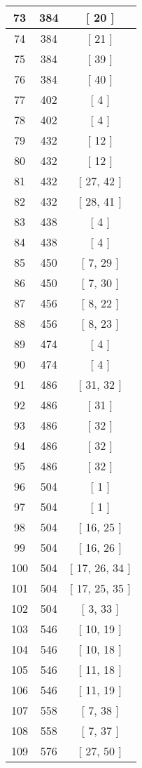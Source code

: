 \begin{center}
\begin{longtable}[H]{|| c c c ||}
\hline
73 & 384 & [ 20 ] \\ 
\hline
74 & 384 & [ 21 ] \\ 
\hline
75 & 384 & [ 39 ] \\ 
\hline
76 & 384 & [ 40 ] \\ 
\hline
77 & 402 & [ 4 ] \\ 
\hline
78 & 402 & [ 4 ] \\ 
\hline
79 & 432 & [ 12 ] \\ 
\hline
80 & 432 & [ 12 ] \\ 
\hline
81 & 432 & [ 27, 42 ] \\ 
\hline
82 & 432 & [ 28, 41 ] \\ 
\hline
83 & 438 & [ 4 ] \\ 
\hline
84 & 438 & [ 4 ] \\ 
\hline
85 & 450 & [ 7, 29 ] \\ 
\hline
86 & 450 & [ 7, 30 ] \\ 
\hline
87 & 456 & [ 8, 22 ] \\ 
\hline
88 & 456 & [ 8, 23 ] \\ 
\hline
89 & 474 & [ 4 ] \\ 
\hline
90 & 474 & [ 4 ] \\ 
\hline
91 & 486 & [ 31, 32 ] \\ 
\hline
92 & 486 & [ 31 ] \\ 
\hline
93 & 486 & [ 32 ] \\ 
\hline
94 & 486 & [ 32 ] \\ 
\hline
95 & 486 & [ 32 ] \\ 
\hline
96 & 504 & [ 1 ] \\ 
\hline
97 & 504 & [ 1 ] \\ 
\hline
98 & 504 & [ 16, 25 ] \\ 
\hline
99 & 504 & [ 16, 26 ] \\ 
\hline
100 & 504 & [ 17, 26, 34 ] \\ 
\hline
101 & 504 & [ 17, 25, 35 ] \\ 
\hline
102 & 504 & [ 3, 33 ] \\ 
\hline
103 & 546 & [ 10, 19 ] \\ 
\hline
104 & 546 & [ 10, 18 ] \\ 
\hline
105 & 546 & [ 11, 18 ] \\ 
\hline
106 & 546 & [ 11, 19 ] \\ 
\hline
107 & 558 & [ 7, 38 ] \\ 
\hline
108 & 558 & [ 7, 37 ] \\ 
\hline
109 & 576 & [ 27, 50 ] \\ 

\end{longtable}
\end{center}
